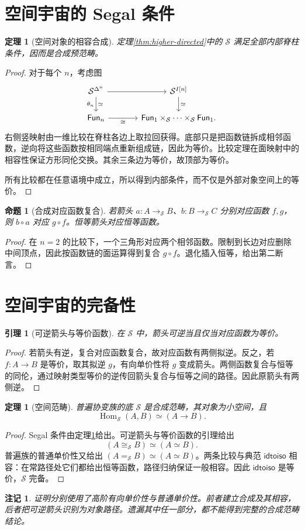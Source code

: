 \documentclass[12pt,oneside,openany,fontset=none]{ctexbook}
\theoremstyle{cn}
\newtheorem{lemma}[definition]{引理}
\newtheorem{proposition}[definition]{命题}
\newtheorem{theorem}[definition]{定理}
\newtheorem{remark}[definition]{注记}
\numberwithin{equation}{chapter}
\newcommand{\Sp}{\mathcal S}
\newcommand{\Hom}{\operatorname{Hom}}
\newcommand{\idtoiso}{\mathsf{idtoiso}}
\begin{document}
\section{空间宇宙的 Segal 条件}
\begin{theorem}[空间对象的相容合成]\label{thm:spaces-segal}
定理\ref{thm:higher-directed}中的 $\Sp$ 满足全部内部脊柱条件，因而是合成预范畴。
\end{theorem}
\begin{proof}
对于每个 $n$，考虑图
\[
\begin{tikzcd}[column sep=large]
\Sp^{\Delta^n}\ar[r]\ar[d,"\theta_n"',"\simeq"]&\Sp^{I[n]}\ar[d,"\simeq"]\\
\mathsf{Fun}_n\ar[r,"\cong"']&
\mathsf{Fun}_1\times_{\Sp}\cdots\times_{\Sp}\mathsf{Fun}_1.
\end{tikzcd}
\]
右侧竖映射由一维比较在脊柱各边上取拉回获得。底部只是把函数链拆成相邻函数，逆向将这些函数按相同端点重新组成链，因此为等价。比较定理在面映射中的相容性保证方形同伦交换。其余三条边为等价，故顶部为等价。

所有比较都在任意语境中成立，所以得到内部条件，而不仅是外部对象空间上的等价。
\end{proof}
\begin{proposition}[合成对应函数复合]
若箭头 $a:A\to_\Sp B$、$b:B\to_\Sp C$ 分别对应函数 $f,g$，则 $b\circ a$ 对应 $g\circ f$。恒等箭头对应恒等函数。
\end{proposition}
\begin{proof}
在 $n=2$ 的比较下，一个三角形对应两个相邻函数。限制到长边对应删除中间顶点，因此按函数链的面运算得到复合 $g\circ f$。退化插入恒等，给出第二断言。
\end{proof}

\section{空间宇宙的完备性}
\begin{lemma}[可逆箭头与等价函数]
在 $\Sp$ 中，箭头可逆当且仅当对应函数为等价。
\end{lemma}
\begin{proof}
若箭头有逆，复合对应函数复合，故对应函数有两侧拟逆。反之，若 $f:A\to B$ 是等价，取其拟逆 $g$，有向单价性将 $g$ 变成箭头。两侧函数复合与恒等的同伦，通过映射类型等价的逆传回箭头复合与恒等之间的路径。因此原箭头有两侧逆。
\end{proof}
\begin{theorem}[空间范畴]\label{thm:spaces-category}
普遍协变族的底 $\Sp$ 是合成范畴，其对象为小空间，且
\[
\Hom_\Sp(A,B)\simeq(A\to B).
\]
\end{theorem}
\begin{proof}
Segal 条件由定理\ref{thm:spaces-segal}给出。可逆箭头与等价函数的引理给出
\[
(A\cong_\Sp B)\simeq(A\simeq B).
\]
普遍族的普通单价性又给出 $(A=_\Sp B)\simeq(A\simeq B)$。两条比较与典范 $\idtoiso$ 相容：在常路径处它们都给出恒等函数，路径归纳保证一般相容。因此 $\idtoiso$ 是等价，$\Sp$ 完备。
\end{proof}
\begin{remark}
证明分别使用了高阶有向单价性与普通单价性。前者建立合成及其相容，后者把可逆箭头识别为对象路径。遗漏其中任一部分，都不能得到完整的合成范畴结论。
\end{remark}
\end{document}
